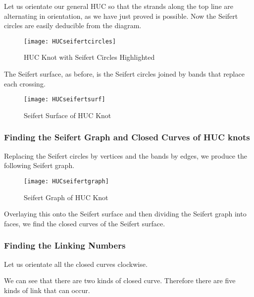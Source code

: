 \documentclass[10pt,a4paper]{report}
\theoremstyle{definition}
\theoremstyle{remark}
\theoremstyle{example}
\begin{document}
 Let us orientate our general HUC so that the strands along the top line are alternating in orientation, as we have just proved is possible. Now the Seifert circles are easily deducible from the diagram.
 
 \begin{figure}[H]
\centering
\graphicspath{{/Users/Imogen/Desktop/seifertimages/lapath/}}
\texttt{[image: HUCseifertcircles]}
\caption{HUC Knot with Seifert Circles Highlighted}
\label{HUCseifertcircles}
\end{figure}
 
 The Seifert surface, as before, is the Seifert circles joined by bands that replace each crossing.
 
 \begin{figure}[H]
\centering
\graphicspath{{/Users/Imogen/Desktop/seifertimages/lapath/}}
\texttt{[image: HUCseifertsurf]}
\caption{Seifert Surface of HUC Knot}
\label{HUCseifertsurf}
\end{figure}

 
 \subsubsection{Finding the Seifert Graph and Closed Curves of HUC knots} 

Replacing the Seifert circles by vertices and the bands by edges, we produce the following Seifert graph.

 \begin{figure}[H]
\centering
\graphicspath{{/Users/Imogen/Desktop/seifertimages/lapath/}}
\texttt{[image: HUCseifertgraph]}
\caption{Seifert Graph of HUC Knot}
\label{HUCseifertgraph}
\end{figure}


Overlaying this onto the Seifert surface and then dividing the Seifert graph into faces, we find the closed curves of the Seifert surface.


\subsubsection{Finding the Linking Numbers}

Let us orientate all the closed curves clockwise.

We can see that there are two kinds of closed curve. Therefore there are five kinds of link that can occur.
\end{document}
